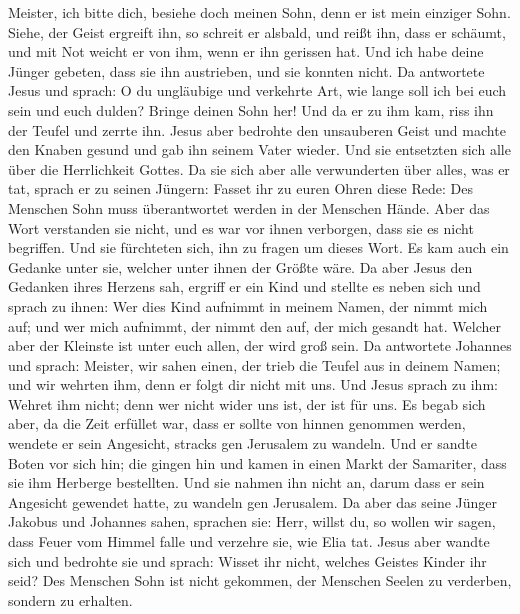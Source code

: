 Meister, ich bitte dich, besiehe doch meinen Sohn, denn er ist mein
einziger Sohn.  Siehe, der Geist ergreift ihn, so schreit
er alsbald, und reißt ihn, dass er schäumt, und mit Not weicht er von
ihm, wenn er ihn gerissen hat.  Und ich habe deine Jünger
gebeten, dass sie ihn austrieben, und sie konnten nicht. 
Da antwortete Jesus und sprach: O du ungläubige und verkehrte Art, wie
lange soll ich bei euch sein und euch dulden? Bringe deinen Sohn her!
 Und da er zu ihm kam, riss ihn der Teufel und zerrte ihn.
Jesus aber bedrohte den unsauberen Geist und machte den Knaben gesund
und gab ihn seinem Vater wieder.  Und sie entsetzten sich
alle über die Herrlichkeit Gottes. Da sie sich aber alle verwunderten
über alles, was er tat, sprach er zu seinen Jüngern: 
Fasset ihr zu euren Ohren diese Rede: Des Menschen Sohn muss
überantwortet werden in der Menschen Hände.  Aber das Wort
verstanden sie nicht, und es war vor ihnen verborgen, dass sie es nicht
begriffen. Und sie fürchteten sich, ihn zu fragen um dieses Wort.
 Es kam auch ein Gedanke unter sie, welcher unter ihnen der
Größte wäre.  Da aber Jesus den Gedanken ihres Herzens sah,
ergriff er ein Kind und stellte es neben sich  und sprach
zu ihnen: Wer dies Kind aufnimmt in meinem Namen, der nimmt mich auf;
und wer mich aufnimmt, der nimmt den auf, der mich gesandt hat. Welcher
aber der Kleinste ist unter euch allen, der wird groß sein.
 Da antwortete Johannes und sprach: Meister, wir sahen
einen, der trieb die Teufel aus in deinem Namen; und wir wehrten ihm,
denn er folgt dir nicht mit uns.  Und Jesus sprach zu ihm:
Wehret ihm nicht; denn wer nicht wider uns ist, der ist für uns.
 Es begab sich aber, da die Zeit erfüllet war, dass er
sollte von hinnen genommen werden, wendete er sein Angesicht, stracks
gen Jerusalem zu wandeln.  Und er sandte Boten vor sich
hin; die gingen hin und kamen in einen Markt der Samariter, dass sie ihm
Herberge bestellten.  Und sie nahmen ihn nicht an, darum
dass er sein Angesicht gewendet hatte, zu wandeln gen Jerusalem.
 Da aber das seine Jünger Jakobus und Johannes sahen,
sprachen sie: Herr, willst du, so wollen wir sagen, dass Feuer vom
Himmel falle und verzehre sie, wie Elia tat.  Jesus aber
wandte sich und bedrohte sie und sprach: Wisset ihr nicht, welches
Geistes Kinder ihr seid?  Des Menschen Sohn ist nicht
gekommen, der Menschen Seelen zu verderben, sondern zu erhalten.

